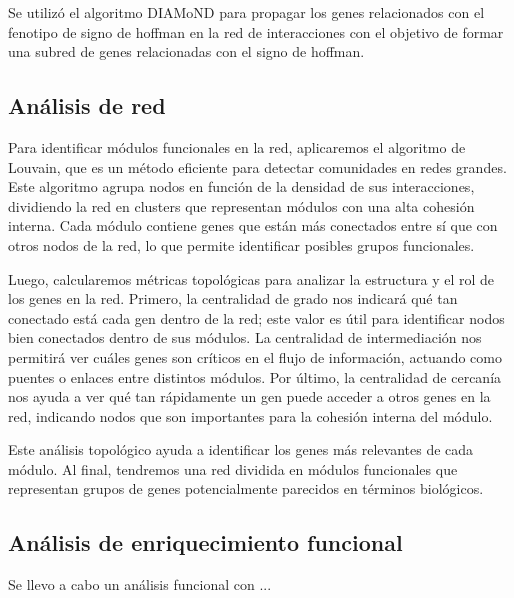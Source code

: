 Se utilizó el algoritmo DIAMoND para propagar los genes relacionados con el fenotipo de signo de hoffman en la red de interacciones con el objetivo de formar una subred de genes relacionadas con el signo de hoffman.

\subsection{Análisis de red}

Para identificar módulos funcionales en la red, aplicaremos el algoritmo de Louvain, que es un método eficiente para detectar comunidades en redes grandes. Este algoritmo agrupa nodos en función de la densidad de sus interacciones, dividiendo la red en clusters que representan módulos con una alta cohesión interna. Cada módulo contiene genes que están más conectados entre sí que con otros nodos de la red, lo que permite identificar posibles grupos funcionales.

Luego, calcularemos métricas topológicas para analizar la estructura y el rol de los genes en la red. Primero, la centralidad de grado nos indicará qué tan conectado está cada gen dentro de la red; este valor es útil para identificar nodos bien conectados dentro de sus módulos. La centralidad de intermediación nos permitirá ver cuáles genes son críticos en el flujo de información, actuando como puentes o enlaces entre distintos módulos. Por último, la centralidad de cercanía nos ayuda a ver qué tan rápidamente un gen puede acceder a otros genes en la red, indicando nodos que son importantes para la cohesión interna del módulo.

Este análisis topológico ayuda a identificar los genes más relevantes de cada módulo. Al final, tendremos una red dividida en módulos funcionales que representan grupos de genes potencialmente parecidos en términos biológicos.

\subsection{Análisis de enriquecimiento funcional}

Se llevo a cabo un análisis funcional con ... 